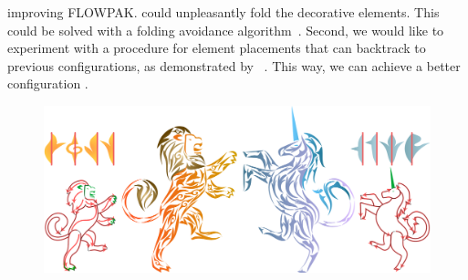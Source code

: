 \newtext
{
 improving FLOWPAK.
 could unpleasantly fold the decorative elements. 
This could be solved with a folding avoidance algorithm~\cite{Asente2010}.
Second, we would like to experiment with a procedure for element placements that can backtrack to previous configurations, 
as demonstrated by ~\cite{Kim2002}. 
This way, we can achieve a better configuration .
}
\begin{figure}
\centering
\includegraphics[width=1.0\textwidth]{figures/flowpak/lion_unicorn.pdf} 
\caption[Packings of lion and unicorn]
{\label{fig_lion_unicorn} 
}
\end{figure}

